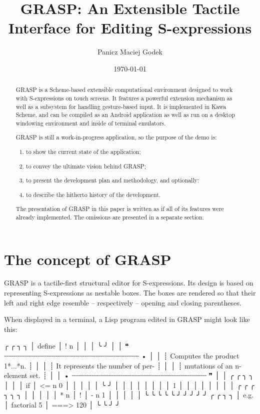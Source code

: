 \documentclass[sigconf]{acmart}
\date{\today}
\title{GRASP: An Extensible Tactile Interface for Editing S-expressions}
\newenvironment{Snippet}{\Verbatim[samepage=true]}{\endVerbatim}
\begin{document}
\author{Panicz Maciej Godek}

\maketitle

\begin{abstract}

GRASP is a Scheme-based extensible computational environment
designed to work with S-expressions on touch screens. It features
a powerful extension mechanism as well as a subsystem for
handling gesture-based input. It is implemented in Kawa Scheme,
and can be compiled as an Android application as well as run
on a desktop windowing environment and inside of terminal
emulators.

GRASP is still a work-in-progress application, so the purpose
of the demo is:
\begin{enumerate}
\item to show the current state of the application;
\item to convey the ultimate vision behind GRASP;
\item to present the development plan and methodology, and optionally:
\item to describe the hitherto history of the development.
\end{enumerate}

The presentation of GRASP in this paper is written as if
all of its features were already implemented. The omissions
are presented in a separate section.

\end{abstract}


\section{The concept of GRASP}

GRASP is a tactile-first structural editor for S-expressions.
Its design is based on representing S-expressions as
nestable boxes. The boxes are rendered so that their left 
and right edge resemble -- respectively -- opening and closing 
parentheses.

When displayed in a terminal, a Lisp program edited in GRASP
might look like this:

\begin{Snippet}
╭        ╭     ╮                       ╮
│ define │ ! n │                       │
│        ╰     ╯                       │
│ ❝ ┈┈┈┈┈┈┈┈┈┈┈┈┈┈┈┈┈┈┈┈┈┈┈┈┈┈┈┈┈┈┈┈ • │
│ ┊ Computes the product 1*...*n.    ┊ │
│ ┊ It represents the number of per- ┊ │
│ ┊ mutations of an n-element set.   ┊ │
│ • ┈┈┈┈┈┈┈┈┈┈┈┈┈┈┈┈┈┈┈┈┈┈┈┈┈┈┈┈┈┈┈┈ ❞ │
│   ╭    ╭        ╮                 ╮  │
│   │ if │ <= n 0 │                 │  │
│   │    ╰        ╯                 │  │
│   │                               │  │
│   │       1                       │  │
│   │                               │  │
│   │       ╭     ╭   ╭       ╮ ╮ ╮ │  │
│   │       │ * n │ ! │ - n 1 │ │ │ │  │
╰   ╰       ╰     ╰   ╰       ╯ ╯ ╯ ╯  ╯
╭      ╭             ╮          ╮       
│ e.g. │ factorial 5 │ ===> 120 │       
╰      ╰             ╯          ╯       
\end{Snippet}
\end{document}

